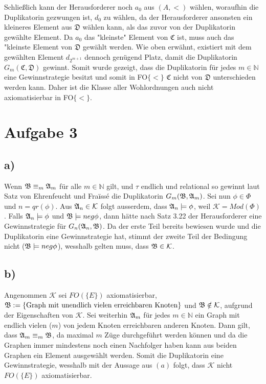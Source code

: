\documentclass[11pt, a4paper]{article}
\begin{document}
Schließlich kann der Herausforderer noch $a_0$ aus $(A, <)$ wählen, woraufhin die Duplikatorin gezwungen ist, $d_0$ zu wählen, da der Herausforderer ansonsten ein kleineres Element aus $\mathfrak{D}$ wählen kann, als das zuvor von der Duplikatorin gewählte Element. Da $a_0$ das "kleinste" Element von $\mathfrak{C}$ ist, muss auch das "kleinste Element von $\mathfrak{D}$ gewählt werden. Wie oben erwähnt, existiert mit dem gewählten Element $d_{2^{m+1}}$ dennoch genügend Platz, damit die Duplikatorin $G_m(\mathfrak{C}, \mathfrak{D})$ gewinnt.\newline
Somit wurde gezeigt, dass die Duplikatorin für jedes $m \in \mathbb{N}$ eine Gewinnstrategie besitzt und somit in FO$\{<\}$ $\mathfrak{C}$ nicht von $\mathfrak{D}$ unterschieden werden kann. Daher ist die Klasse aller Wohlordnungen auch nicht axiomatisierbar in FO$\{<\}$.

\section*{Aufgabe 3}
\subsection*{a)}
Wenn $\frak{B} \equiv_m \frak{A}_m$ für alle $m \in \mathbb{N}$ gilt, und $\tau$ endlich und relational so gewinnt laut Satz von Ehrenfeucht und Fra\"issé die Duplikatorin $G_m(\frak{B}, \frak{A}_m)$.
Sei nun $\phi \in \Phi$ und $n = qr(\phi)$. Aus $\frak{A}_n \in \mathcal{K}$ folgt ausserdem, dass $\frak{A}_n \models \phi$, weil $\mathcal{K} = Mod(\Phi)$.
Falls $\frak{A}_n \models \phi$ und $\frak{B} \models neg \phi$, dann h\"atte nach Satz 3.22 der Herausforderer eine Gewinnstrategie f\"ur $G_n(\frak{A}_n, \frak{B})$.
Da der erste Teil bereits bewiesen wurde und die Duplikatorin eine Gewinnstrategie hat, stimmt der zweite Teil der Bedingung nicht ($\frak{B} \models neg \phi$), wesshalb gelten muss, dass $\frak{B} \in \mathcal{K}$.

\subsection*{b)}
Angenommen $\mathcal{K}$ sei $FO(\{E\})$ axiomatisierbar, $\frak{B} := \{\text{Graph mit unendlich vielen erreichbaren Knoten}\}$ und $\frak{B} \notin \mathcal{K}$, aufgrund der Eigenschaften von $\mathcal{K}$.
Sei weiterhin $\frak{A}_m$ f\"ur jedes $m \in \mathbb{N}$ ein Graph mit endlich vielen ($m$) von jedem Knoten erreichbaren anderen Knoten.
Dann gilt, dass $\frak{A}_m \equiv_m \frak{B}$, da maximal $m$ Z\"uge durchgef\"uhrt werden k\"onnen und da die Graphen immer mindestens noch einen Nachfolger haben kann aus beiden Graphen ein Element ausgew\"ahlt werden.
Somit die Duplikatorin eine Gewinnstrategie, wesshalb mit der Aussage aus $(a)$ folgt, dass $\mathcal{K}$ nicht $FO(\{E\})$ axiomatisierbar.
\end{document}
